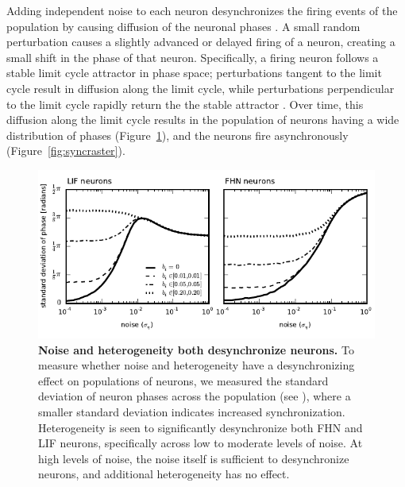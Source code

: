 \documentclass[12pt]{article}
\begin{document}
Adding independent noise to each neuron desynchronizes the firing events of the population by causing diffusion of the neuronal phases \citep{Stocks2001a}. A small random perturbation causes a slightly advanced or delayed firing of a neuron, creating a small shift in the phase of that neuron. Specifically, a firing neuron follows a stable limit cycle attractor in phase space; perturbations tangent to the limit cycle result in diffusion along the limit cycle, while perturbations perpendicular to the limit cycle rapidly return the the stable attractor \citep{Tomita1974}. Over time, this diffusion along the limit cycle results in the population of neurons having a wide distribution of phases (Figure~\ref{fig:phase}), and the neurons fire asynchronously (Figure~\ref{fig:syncraster}).

\begin{figure}
  \ifx\hidefigures\undefined
    \centering
    \includegraphics[width=\textwidth]{figure5_phase.pdf}
  \fi
  \caption{
    \textbf{Noise and heterogeneity both desynchronize neurons.} To measure whether noise and heterogeneity have a desynchronizing effect on populations of neurons, we measured the standard deviation of neuron phases across the population (see \textsc{}), where a smaller standard deviation indicates increased synchronization. Heterogeneity is seen to significantly desynchronize both FHN and LIF neurons, specifically across low to moderate levels of noise. At high levels of noise, the noise itself is sufficient to desynchronize neurons, and additional heterogeneity has no effect.
  }
  \label{fig:phase}
\end{figure}
\end{document}
